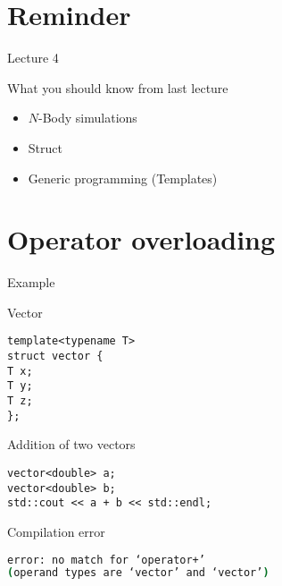 \documentclass[\classoption]{beamer}
\title{\coursename}
\subtitle{Lecture 5: Operator overloading and structuring programs}
\author{\tiny Patrick Diehl \orcid{0000-0003-3922-8419}}
\date {
 \tiny \url{\courseurl}
\vspace{2cm}
\doclicenseThis  
  
}
\begin{document}
 {
    \frame {
        \titlepage
    }
}

\frame{

\tableofcontents

}


\section{Reminder}
\begin{frame}{Lecture 4}
\begin{block}{What you should know from last lecture}
\begin{itemize}
\item $N$-Body simulations
\item Struct
\item Generic programming (Templates)
\end{itemize}
\end{block}
\end{frame}

\section{Operator overloading}

\begin{frame}[fragile]{Example}

\begin{block}{Vector}
\begin{lstlisting}
template<typename T>
struct vector {
T x;
T y;
T z;
};
\end{lstlisting}
\end{block}

\begin{block}{Addition of two vectors}
\begin{lstlisting}
vector<double> a;
vector<double> b;
std::cout << a + b << std::endl;
\end{lstlisting}
\end{block}
\pause
\begin{block}{Compilation error}
\begin{lstlisting}[language=bash]
error: no match for ‘operator+’ 
(operand types are ‘vector’ and ‘vector’)
\end{lstlisting}
\end{block}
\end{frame}
\end{document}

